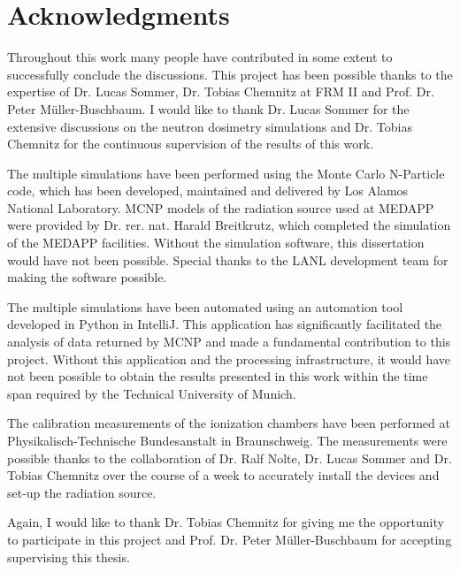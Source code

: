 \chapter*{Acknowledgments}


Throughout this work many people have contributed in some extent to successfully conclude the discussions. This project has been possible thanks to the expertise of Dr. Lucas Sommer, Dr. Tobias Chemnitz at FRM II and Prof. Dr. Peter Müller-Buschbaum. I would like to thank Dr. Lucas Sommer for the extensive discussions on the neutron dosimetry simulations and Dr. Tobias Chemnitz for the continuous supervision of the results of this work.

The multiple simulations have been performed using the Monte Carlo N-Particle code, which has been developed, maintained and delivered by Los Alamos National Laboratory. MCNP models of the radiation source used at MEDAPP were provided by Dr. rer. nat. Harald Breitkrutz, which completed the simulation of the MEDAPP facilities. Without the simulation software, this dissertation would have not been possible. Special thanks to the LANL development team for making the software possible.

The multiple simulations have been automated using an automation tool developed in Python in IntelliJ. This application has significantly facilitated the analysis of data returned by MCNP and made a fundamental contribution to this project. Without this application and the processing infrastructure, it would have not been possible to obtain the results presented in this work within the time span required by the Technical University of Munich.

The calibration measurements of the ionization chambers have been performed at Physikalisch-Technische Bundesanstalt in Braunschweig. The measurements were possible thanks to the collaboration of Dr. Ralf Nolte, Dr. Lucas Sommer and Dr. Tobias Chemnitz over the course of a week to accurately install the devices and set-up the radiation source.

Again, I would like to thank Dr. Tobias Chemnitz for giving me the opportunity to participate in this project and Prof. Dr. Peter Müller-Buschbaum for accepting supervising this thesis. 


\cleardoublepage{}
